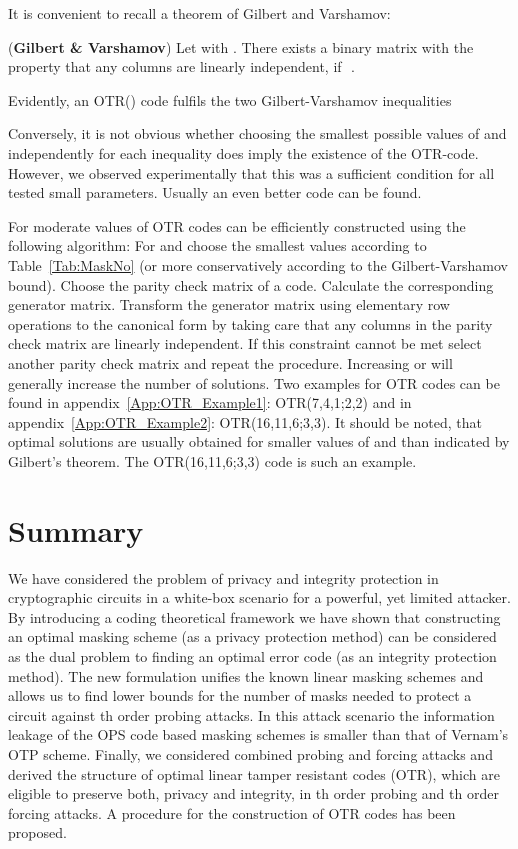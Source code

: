 \documentclass[11pt]{llncs}
\begin{document}
It is convenient to recall a theorem of Gilbert and Varshamov:
\begin{theorem} (\textbf{Gilbert \& Varshamov})
Let  with .
There exists a binary  matrix with the property
that any  columns are linearly independent,
if\,\,\,\,.
\end{theorem}
Evidently, an OTR() code fulfils the two Gilbert-Varshamov inequalities

Conversely, it is not obvious whether choosing the smallest
possible values of  and  independently
for each inequality does imply the existence of the OTR-code.
However, we observed experimentally that this was a sufficient condition
for all tested small parameters. Usually an even better code can be found.

For moderate values of  OTR codes can
be efficiently constructed
using the following algorithm:
For  and  choose the smallest values according to Table~\ref{Tab:MaskNo}
(or more conservatively according to the Gilbert-Varshamov bound).
Choose the parity check matrix of a  code.
Calculate the corresponding generator matrix.
Transform the generator matrix using elementary row operations
to the canonical form by taking care that any  columns in
the parity check matrix are linearly independent.
If this constraint cannot be met
select another parity check matrix
and repeat the procedure. Increasing  or  will generally
increase the number of solutions.
Two examples for OTR codes
can be found
in appendix~\ref{App:OTR_Example1}: OTR(7,4,1;2,2) and
in appendix~\ref{App:OTR_Example2}: OTR(16,11,6;3,3).
It should be noted, that optimal solutions are usually
obtained for smaller values of  and  than indicated by Gilbert's theorem.
The OTR(16,11,6;3,3) code is such an example.


\section{Summary}
We have considered the problem of privacy and integrity protection
in cryptographic circuits in a white-box scenario
for a powerful, yet limited attacker.
By introducing a coding theoretical framework
we have shown that constructing an optimal masking scheme
(as a privacy protection method)
can be considered as the dual problem to finding an optimal error code
(as an integrity protection method).
The new formulation
unifies the known linear masking schemes and
allows us to find
lower bounds for the number of masks needed
to protect a circuit against th order probing attacks.
In this attack scenario the information leakage of
the OPS code based masking
schemes is smaller
than that of Vernam's OTP scheme.
Finally, we considered combined probing and forcing attacks
and derived the structure of optimal linear tamper resistant codes (OTR),
which are eligible to preserve both, privacy and integrity,
in th order probing and th order forcing attacks.
A procedure for the construction of OTR codes has been proposed.
\end{document}
